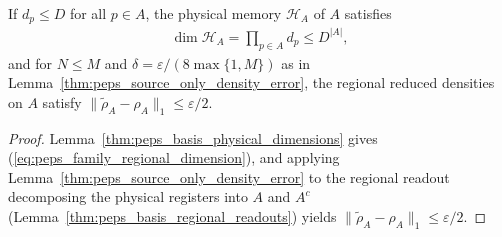\begin{lemma}
    \label{thm:peps_family_regional_dimensions}
    \leanok
    If $d_p\le D$ for all $p\in A$, the physical memory $\mathcal H_A$ of $A$ satisfies
    \begin{align}
        \dim\mathcal H_A=\prod_{p\in A}d_p\le D^{|A|},
        \label{eq:peps_family_regional_dimension}
    \end{align}
    and for $N\le M$ and $\delta=\varepsilon/(8\max\{1,M\})$ as in Lemma~\ref{thm:peps_source_only_density_error}, the regional reduced densities on $A$ satisfy $\|\widetilde\rho_A-\rho_A\|_1\le\varepsilon/2$.
\end{lemma}

\begin{proof}\leanok
    Lemma~\ref{thm:peps_basis_physical_dimensions} gives (\ref{eq:peps_family_regional_dimension}), and applying Lemma~\ref{thm:peps_source_only_density_error} to the regional readout decomposing the physical registers into $A$ and $A^c$ (Lemma~\ref{thm:peps_basis_regional_readouts}) yields $\|\widetilde\rho_A-\rho_A\|_1\le\varepsilon/2$.
\end{proof}


